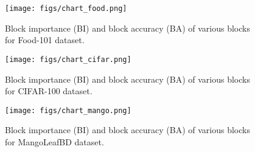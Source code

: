 \documentclass[a4paper,fleqn]{cas-sc}
\begin{document}
\begin{figure}
	\centering
		\texttt{[image: figs/chart\_food.png]}
	\caption{Block importance (BI) and block accuracy (BA) of various blocks for Food-101 dataset.}
	\label{FoodBI}
\end{figure}

\begin{figure}
	\centering
		\texttt{[image: figs/chart\_cifar.png]}
	\caption{Block importance (BI) and block accuracy (BA) of various blocks for CIFAR-100 dataset.}
	\label{CIFARBI}
\end{figure}

\begin{figure}
	\centering
		\texttt{[image: figs/chart\_mango.png]}
	\caption{Block importance (BI) and block accuracy (BA) of various blocks for MangoLeafBD dataset.}
	\label{MANGOBI}
\end{figure}

\begin{comment}
\begin{table}[width=\linewidth,cols=4,pos=h]
\caption{BI and BA (CIFAR-100)}
\label{tbl8}
\begin{tabular*}{\tblwidth}{ c | c | c | c }
\toprule
 block & importance & training accuracy & testing accuracy \\
\midrule
1 & 1.952 & 0.88 & 0.72 \\
2 & 1.471 & 0.89 & 0.72 \\
3 & 1.152 & 0.89 & 0.72 \\
4 & 0.964 & 0.90 & 0.71 \\
5 & 1.021 & 0.89 & 0.72 \\
6 & 1.000 & 0.90 & 0.71 \\
7 & 0.965 & 0.89 & 0.72 \\
\bottomrule
\end{tabular*}
\end{table}

\begin{table}[width=\linewidth,cols=4,pos=h]
\caption{BI and BA (MangoLeafBD)}
\label{tbl-mango-bi}
\begin{tabular*}{\tblwidth}{ c | c | c | c }
\toprule
 block & importance & training accuracy & testing accuracy \\
\midrule
1 & 1.491 & 1 & 0.993 \\
2 & 1.459 & 1 & 0.995 \\
3 & 1.259 & 1 & 0.995 \\
4 & 1.078 & 1 & 0.995 \\
5 & 0.029 & 1 & 0.995 \\
6 & 0.815 & 1 & 0.995 \\
7 & 0.022 & 1 & 0.995 \\
\bottomrule
\end{tabular*}
\end{table}
\end{comment}
\end{document}
